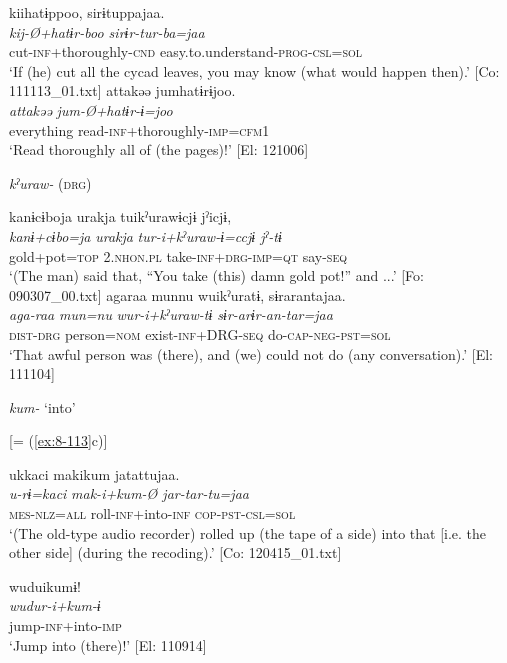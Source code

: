 {\TM}
\glll  kiihatɨppoo,  sirɨtuppajaa.\\
\textit{kij-Ø+hatɨr-boo  sirɨr-tur-ba=jaa}\\
cut-\textsc{inf}+thoroughly-\textsc{cnd}  easy.to.understand-\textsc{prog}-\textsc{csl}=\textsc{sol}\\
\glt ‘If (he) cut all the cycad leaves, you may know (what would happen then).’ [Co: 111113\_01.txt]
\ex
{\TM}
\glll  attakəə  jumhatɨrɨjoo.\\
\textit{attakəə}  \textit{jum-Ø+hatɨr-ɨ=joo}\\
everything  read-\textsc{inf}+thoroughly-\textsc{imp}=\textsc{cfm1}\\
\glt ‘Read thoroughly all of (the pages)!’ [El: 121006]

  \textit{kˀuraw-} (\textsc{drg})

\ex
{\TM}
\glll  kanɨcɨboja  urakja  tuikˀurawɨcjɨ  jˀicjɨ,\\
\textit{kanɨ+cɨbo=ja}  \textit{urakja}  \textit{tur-i+kˀuraw-ɨ=ccjɨ  jˀ-tɨ}\\
gold+pot=\textsc{top}  2.\textsc{nhon}.\textsc{pl}  take-\textsc{inf}+\textsc{drg}-\textsc{imp}=\textsc{qt}  say-\textsc{seq}\\
\glt ‘(The man) said that, “You take (this) damn gold pot!” and ...’ [Fo: 090307\_00.txt]
\ex
{\TM}
\glll  agaraa  munnu  wuikˀuratɨ,  sɨrarantajaa.\\
\textit{aga-raa}  \textit{mun=nu}  \textit{wur-i+kˀuraw-tɨ  sɨr-arɨr-an-tar=jaa}\\
\textsc{dist}-\textsc{drg}  person=\textsc{nom}  exist-\textsc{inf}+DRG-\textsc{seq}  do-\textsc{cap}-\textsc{neg}-\textsc{pst}=\textsc{sol}\\
\glt ‘That awful person was (there), and (we) could not do (any conversation).’ [El: 111104]

  \textit{kum-} ‘into’


\ex{} [= (\ref{ex:8-113}c)]

{\TM}
\glll  ukkaci  makikum  jatattujaa.\\
\textit{u-rɨ=kaci}  \textit{mak-i+kum-Ø  jar-tar-tu=jaa}\\
\textsc{mes}-\textsc{nlz}=\textsc{all}  roll-\textsc{inf}+into-\textsc{inf}  \textsc{cop}-\textsc{pst}-\textsc{csl}=\textsc{sol}\\
\glt ‘(The old-type audio recorder) rolled up (the tape of a side) into that [i.e. the other side] (during the recoding).’ [Co: 120415\_01.txt]

\ex
{\TM}
\glll  wuduikumɨ!\\
\textit{wudur-i+kum-ɨ}\\
jump-\textsc{inf}+into-\textsc{imp}\\
\glt ‘Jump into (there)!’ [El: 110914]

